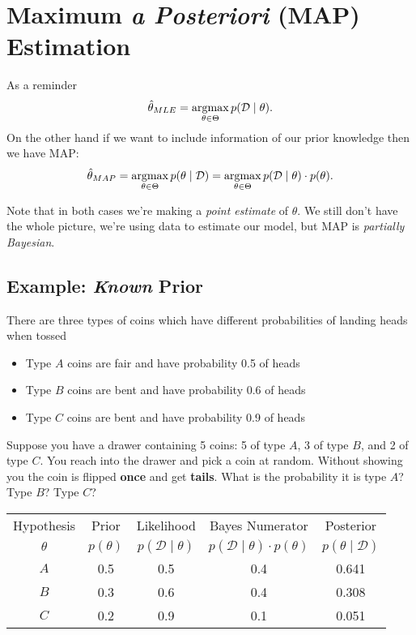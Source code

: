 \section{Maximum \textit{a Posteriori} (MAP) Estimation}

As a reminder 
\[\hat\theta_{MLE} = \operatorname*{argmax}_{\theta\in\Theta} p(\mathcal{D}\mid \theta).\]
On the other hand if we want to include information of our prior knowledge 
then we have MAP:
\[\hat\theta_{MAP} = \operatorname*{argmax}_{\theta\in\Theta} p(\theta\mid\mathcal{D}) =  \operatorname*{argmax}_{\theta\in\Theta} p(\mathcal{D}\mid \theta)\cdot p(\theta).\]

Note that in both cases we're making a \emph{point estimate} of $\theta$. 
We still don't have the whole picture, we're using data to estimate our model, 
but MAP is \emph{partially Bayesian}. 


\subsection{Example: \textit{Known} Prior}
There are three types of coins which have different probabilities of landing heads when tossed
\begin{itemize}
\item[] Type $A$ coins are fair and have probability 0.5 of heads
\item[] Type $B$ coins are bent and have probability 0.6 of heads
\item[] Type $C$ coins are bent and have probability 0.9 of heads
\end{itemize}

Suppose you have a drawer containing 5 coins: 
5 of type $A$, 3 of type $B$, and 2 of type $C$. 
You reach into the drawer and pick a coin at random. 
Without showing you the coin is flipped \textbf{once} and get \textbf{tails}. 
What is the probability it is type $A$? Type $B$? Type $C$? 

\begin{center}
\begin{tabular}{|c||c|c|c|c|}
\hline
Hypothesis & Prior & Likelihood & Bayes Numerator & Posterior\\
$\theta$ & $p(\theta)$ & $p(\mathcal{D}\mid\theta)$ & $p(\mathcal{D}\mid\theta)\cdot p(\theta)$ & $p(\theta\mid\mathcal{D})$\\
\hline
\hline
$A$	& 0.5		& 0.5		& 0.4		& 0.641\\
$B$	& 0.3		& 0.6		& 0.4		& 0.308\\
$C$	& 0.2		& 0.9		& 0.1		& 0.051\\
\hline
\end{tabular}
\end{center}


